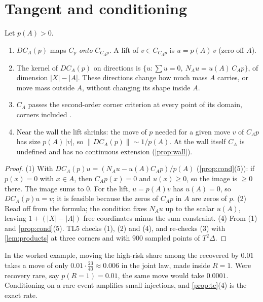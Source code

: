 \documentclass[11pt]{article}
\theoremstyle{definition}\newtheorem{definition}[theorem]{Definition}\newtheorem{remark}[theorem]{Remark}\newtheorem{example}[theorem]{Example}
\begin{document}
\section{Tangent and conditioning}\label{sec:tc}
\begin{proposition}\label{prop:tc}
Let $p(A)>0$.
\begin{enumerate}
\item[(1)] $DC_A(p)$ maps $C_p$ \emph{onto} $C_{C_Ap}$. A lift of $v\in C_{C_Ap}$ is $u=p(A)\,v$ (zero off $A$).
\item[(2)] The kernel of $DC_A(p)$ on directions is $\{u:\sum u=0,\ N_Au=u(A)\,C_Ap\}$, of dimension $|X|-|A|$. These directions change
  how much mass $A$ carries, or move mass outside $A$, without changing its shape inside $A$.
\item[(3)] $C_A$ passes the second-order corner criterion at every point of its domain, corners included
  \cite[Corollary ``the second-order subcategory'']{TangentCompanion}.
\item[(4)] Near the wall the lift shrinks: the move of $p$ needed for a given move $v$ of $C_Ap$ has size $p(A)\,|v|$, so
  $\|DC_A(p)\|\sim1/p(A)$. At the wall itself $C_A$ is undefined and has no continuous extension (\cref{prop:wall}).
\end{enumerate}
\end{proposition}

\begin{proof}
(1) With $DC_A(p)u=(N_Au-u(A)C_Ap)/p(A)$ (\cref{prop:cond}(5)): if $p(x)=0$ with $x\in A$, then $C_Ap(x)=0$ and $u(x)\ge0$, so the image is $\ge0$
there. The image sums to $0$. For the lift, $u=p(A)v$ has $u(A)=0$, so $DC_A(p)u=v$; it is feasible because the zeros of $C_Ap$ in $A$ are zeros
of $p$. (2) Read off from the formula; the condition fixes $N_Au$ up to the scalar $u(A)$, leaving $1+(|X|-|A|)$ free coordinates minus the
sum constraint. (4) From (1) and \cref{prop:cond}(5). TL5 checks (1), (2) and (4), and re-checks (3) with \cref{lem:products} at three
corners and with $900$ sampled points of $T^2\Delta$.
\end{proof}

In the worked example, moving the high-risk share among the recovered by $0.01$ takes a move of only $0.01\cdot\tfrac{23}{40}\approx0.006$
in the joint law, made inside $R=1$. Were recovery rare, say $p(R{=}1)=0.01$, the same move would take $0.0001$. Conditioning on a rare
event amplifies small injections, and \cref{prop:tc}(4) is the exact rate.
\end{document}
